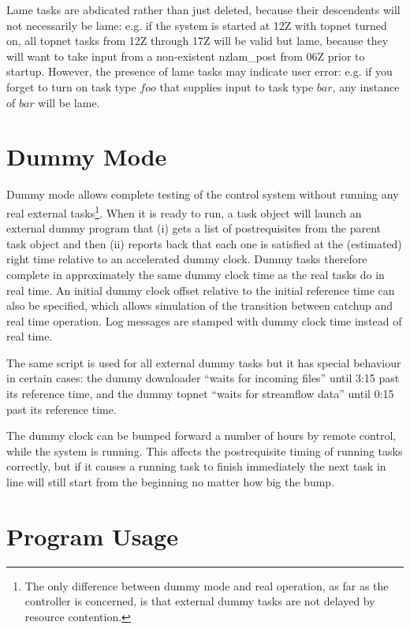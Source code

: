 \documentclass[11pt,a4paper]{article}
\begin{document}
Lame tasks are abdicated rather than just deleted, because their
descendents will not necessarily be lame: e.g. if the system is started
at 12Z with topnet turned on, all topnet tasks from 12Z through 17Z will
be valid but lame, because they will want to take input from a
non-existent nzlam\_post from 06Z prior to startup. However, the
presence of lame tasks may indicate user error: e.g. if you forget
to turn on task type $foo$ that supplies input to task type $bar$,
any instance of $bar$ will be lame.


\section{Dummy Mode}

Dummy mode allows complete testing of the control system without running
any real external tasks\footnote{The only difference between dummy mode
and real operation, as far as the controller is concerned, is that
external dummy tasks are not delayed by resource contention.}. When it
is ready to run, a task object will launch an external dummy program
that (i) gets a list of postrequisites from the parent task object and
then (ii) reports back that each one is satisfied at the (estimated)
right time relative to an accelerated dummy clock. Dummy tasks therefore
complete in approximately the same dummy clock time as the real tasks do
in real time. An initial dummy clock offset relative to the initial
reference time can also be specified, which allows simulation of the
transition between catchup and real time operation. Log messages are
stamped with dummy clock time instead of real time.

The same script is used for all external dummy tasks but it has special
behaviour in certain cases: the dummy downloader ``waits for incoming
files'' until 3:15 past its reference time, and the dummy topnet ``waits
for streamflow data'' until 0:15 past its reference time.

The dummy clock can be bumped forward a number of hours by remote
control, while the system is running. This affects the postrequisite
timing of running tasks correctly, but if it causes a running task to
finish immediately the next task in line will still start from the
beginning no matter how big the bump.


\section{Program Usage}
\end{document}
